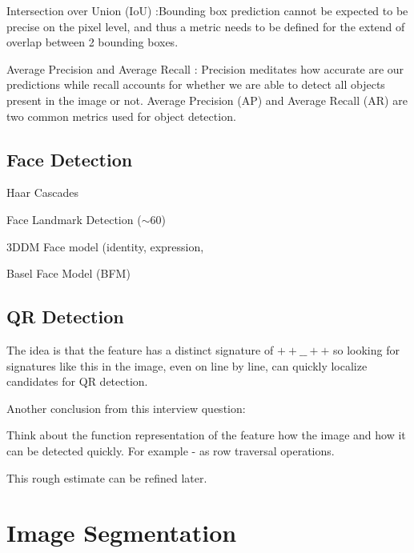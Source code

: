 Intersection over Union (IoU) :Bounding box prediction cannot be expected to be precise on the pixel level, and thus a metric needs to be defined for the extend of overlap between 2 bounding boxes.

Average Precision and Average Recall : Precision meditates how accurate are our predictions while recall accounts for whether we are able to detect all objects present in the image or not. Average Precision (AP) and Average Recall (AR) are two common metrics used for object detection.

\subsection{Face Detection}

Haar Cascades

Face Landmark Detection ($\sim 60$)

3DDM Face model (identity, expression,

Basel Face Model (BFM)

\subsection{QR Detection}

The idea is that the feature has a distinct signature of $++\_\_++$ so looking for signatures like this in the image, even on line by line, can quickly localize candidates for QR detection. 

Another conclusion from this interview question: 

Think about the function representation of the feature how the image and how it can be detected quickly. For example - as row traversal operations.

This rough estimate can be refined later.

\section{Image Segmentation}

